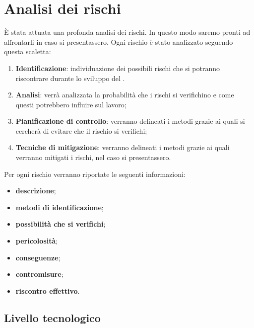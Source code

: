 \section{Analisi dei rischi} 
\label{analisiRischi}
	È stata attuata una profonda analisi dei rischi. In questo modo saremo pronti ad affrontarli in caso si presentassero.
	Ogni rischio è stato analizzato seguendo questa scaletta:
	\begin{enumerate}
		\item \textbf{Identificazione}: individuazione dei possibili rischi che si potranno riscontrare durante lo sviluppo del .
		\item \textbf{Analisi}: verrà analizzata la probabilità che i rischi si verifichino e come questi potrebbero influire sul lavoro;
		\item \textbf{Pianificazione di controllo}: verranno delineati i metodi grazie ai quali si cercherà di evitare che il rischio si verifichi;
		\item \textbf{Tecniche di mitigazione}: verranno delineati i metodi grazie ai quali verranno mitigati i rischi, nel caso si presentassero.
	\end{enumerate}
	Per ogni rischio verranno riportate le seguenti informazioni:
	\begin{itemize}
		\item \textbf{descrizione};
		\item \textbf{metodi di identificazione};
		\item \textbf{possibilità che si verifichi};
		\item \textbf{pericolosità};
		\item \textbf{conseguenze};
		\item \textbf{contromisure};
		\item \textbf{riscontro effettivo}.
	\end{itemize}
	
	\subsection{Livello tecnologico}
